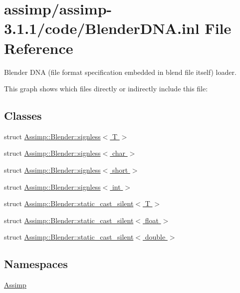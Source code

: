 \hypertarget{_blender_d_n_a_8inl}{\section{assimp/assimp-\/3.1.1/code/\+Blender\+D\+N\+A.inl File Reference}
\label{_blender_d_n_a_8inl}
}


Blender {\ttfamily D\+N\+A} (file format specification embedded in blend file itself) loader.  


This graph shows which files directly or indirectly include this file\+:
\subsection*{Classes}
\begin{DoxyCompactItemize}
\item 
struct \hyperlink{struct_assimp_1_1_blender_1_1signless}{Assimp\+::\+Blender\+::signless$<$ T $>$}
\item 
struct \hyperlink{struct_assimp_1_1_blender_1_1signless_3_01char_01_4}{Assimp\+::\+Blender\+::signless$<$ char $>$}
\item 
struct \hyperlink{struct_assimp_1_1_blender_1_1signless_3_01short_01_4}{Assimp\+::\+Blender\+::signless$<$ short $>$}
\item 
struct \hyperlink{struct_assimp_1_1_blender_1_1signless_3_01int_01_4}{Assimp\+::\+Blender\+::signless$<$ int $>$}
\item 
struct \hyperlink{struct_assimp_1_1_blender_1_1static__cast__silent}{Assimp\+::\+Blender\+::static\+\_\+cast\+\_\+silent$<$ T $>$}
\item 
struct \hyperlink{struct_assimp_1_1_blender_1_1static__cast__silent_3_01float_01_4}{Assimp\+::\+Blender\+::static\+\_\+cast\+\_\+silent$<$ float $>$}
\item 
struct \hyperlink{struct_assimp_1_1_blender_1_1static__cast__silent_3_01double_01_4}{Assimp\+::\+Blender\+::static\+\_\+cast\+\_\+silent$<$ double $>$}
\end{DoxyCompactItemize}
\subsection*{Namespaces}
\begin{DoxyCompactItemize}
\item 
 \hyperlink{namespace_assimp}{Assimp}
\end{DoxyCompactItemize}

